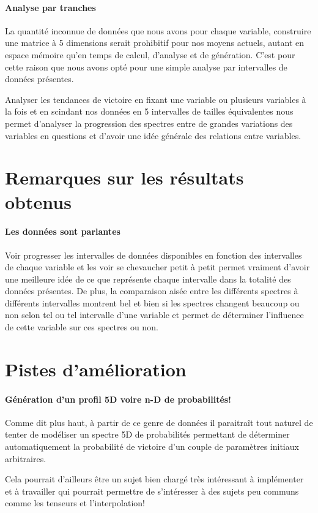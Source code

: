 		\paragraph{Analyse par tranches}
		La quantité inconnue de données que nous avons pour chaque variable, construire une matrice à 5 dimensions serait prohibitif pour nos moyens actuels, autant en espace mémoire qu'en temps de calcul, d'analyse et de génération.
		C'est pour cette raison que nous avons opté pour une simple analyse par intervalles de données présentes.
	
		\begin{result}
			Analyser les tendances de victoire en fixant une variable ou plusieurs variables à la fois et en scindant nos données en 5 intervalles de tailles équivalentes nous permet d'analyser la progression des spectres entre de grandes variations des variables en questions et d'avoir une idée générale des relations entre variables.
		\end{result}
	
		
	\section{Remarques sur les résultats obtenus}
	
		\paragraph{Les données sont parlantes}
		Voir progresser les intervalles de données disponibles en fonction des intervalles de chaque variable et les voir se chevaucher petit à petit permet vraiment d'avoir une meilleure idée de ce que représente chaque intervalle dans la totalité des données présentes.
		De plus, la comparaison aisée entre les différents spectres à différents intervalles montrent bel et bien si les spectres changent beaucoup ou non selon tel ou tel intervalle d'une variable et permet de déterminer l'influence de cette variable sur ces spectres ou non.
		
	\section{Pistes d'amélioration}
	
		\paragraph{Génération d'un profil 5D voire n-D de probabilités!}
		Comme dit plus haut, à partir de ce genre de données il paraitraît tout naturel de tenter de modéliser un spectre 5D de probabilités permettant de déterminer automatiquement la probabilité de victoire d'un couple de paramètres initiaux arbitraires.
		
		Cela pourrait d'ailleurs être un sujet bien chargé très intéressant à implémenter et à travailler qui pourrait permettre de s'intéresser à des sujets peu communs comme les tenseurs et l'interpolation!
		